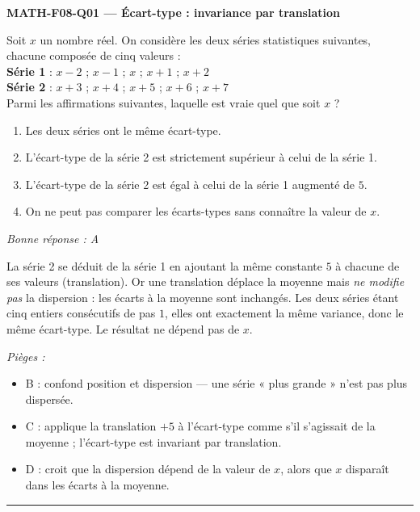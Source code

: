 \documentclass[11pt,a4paper]{article}
\begin{document}
\noindent\textbf{MATH-F08-Q01 --- Écart-type : invariance par translation}\par
Soit $x$ un nombre réel. On considère les deux séries statistiques suivantes, chacune composée de cinq valeurs :\\
\textbf{Série 1} : $x-2$ ; $x-1$ ; $x$ ; $x+1$ ; $x+2$\\
\textbf{Série 2} : $x+3$ ; $x+4$ ; $x+5$ ; $x+6$ ; $x+7$\\
Parmi les affirmations suivantes, laquelle est vraie quel que soit $x$ ?
\begin{enumerate}[label=\Alph*)]
\item Les deux séries ont le même écart-type.
\item L'écart-type de la série 2 est strictement supérieur à celui de la série 1.
\item L'écart-type de la série 2 est égal à celui de la série 1 augmenté de $5$.
\item On ne peut pas comparer les écarts-types sans connaître la valeur de $x$.
\end{enumerate}
\textit{Bonne réponse : A}\par
La série 2 se déduit de la série 1 en ajoutant la même constante $5$ à chacune de ses valeurs (translation). Or une translation déplace la moyenne mais \emph{ne modifie pas} la dispersion : les écarts à la moyenne sont inchangés. Les deux séries étant cinq entiers consécutifs de pas $1$, elles ont exactement la même variance, donc le même écart-type. Le résultat ne dépend pas de $x$.\par
\textit{Pièges :}
\begin{itemize}
\item B : confond position et dispersion --- une série « plus grande » n'est pas plus dispersée.
\item C : applique la translation $+5$ à l'écart-type comme s'il s'agissait de la moyenne ; l'écart-type est invariant par translation.
\item D : croit que la dispersion dépend de la valeur de $x$, alors que $x$ disparaît dans les écarts à la moyenne.
\end{itemize}
\vspace{8pt}\hrule\vspace{8pt}
\end{document}
